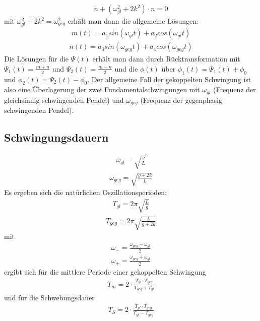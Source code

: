 \documentclass[a4paper,10pt]{scrartcl}
\begin{document}
\begin{itemize}
\begin{itemize}
\begin{align}
					\ddot{n}+(\omega_{gl}^{2}+2k^{2})\cdot n = 0
					\end{align}
					mit \(\omega_{gl}^{2}+2k^{2}=\omega_{geg}^{2}\)
					erhält man dann die allgemeine Lösungen:
					\begin{align}
					m(t)=a_{1}sin(\omega_{gl}t)+a_{2}cos(\omega_{gl}t)
					\end{align}
					\begin{align}
					n(t)=a_{3}sin(\omega_{geg}t)+a_{4}cos(\omega_{geg}t)
					\end{align}
					\newpage
					Die Lösungen für die \(\Psi(t)\) erhält man dann durch Rücktransformation mit \(\Psi_{1}(t)=\frac{m+n}{2}\) und \(\Psi_{2}(t)=\frac{m-n}{2}\) und die \(\phi(t)\) über \(\phi_{1}(t)=\Psi_{1}(t)+\phi_{0}\) und \(\phi_{2}(t)=\Psi_{2}(t)-\phi_{0}\). Der allgemeine Fall der gekoppelten Schwingung ist also eine Überlagerung der zwei Fundamentalschwingungen mit \(\omega_{gl}\) (Frequenz der gleichsinnig schwingenden Pendel) und \(\omega_{geg}\) (Frequenz der gegenphasig schwingenden Pendel). 
				\end{itemize}
			
			\end{itemize}
		\subsection{Schwingungsdauern}
			\begin{align}
			\omega_{gl}=\sqrt{\frac{g}{L}}
			\end{align}
			\begin{align}
			\omega_{geg}=\sqrt{\frac{g+2k}{L}}
			\end{align}
			Es ergeben sich die natürlichen Oszillationsperioden:
			\begin{align}
			T_{gl}=2\pi \sqrt{\frac{L}{g}}
			\end{align}
			\begin{align}
			T_{geg}=2\pi \sqrt{\frac{L}{g+2k}}
			\end{align}
			mit
			\begin{align*}
			\omega_{-}=\frac{\omega_{geg}-\omega_{gl}}{2}
			\end{align*}
			\begin{align*}
			\omega_{+}=\frac{\omega_{geg}+\omega_{gl}}{2}
			\end{align*}
			ergibt sich für die mittlere Periode einer gekoppelten Schwingung
			\begin{align}
			T_{m}=2\cdot \frac{T_{gl}\cdot T_{geg}}{T_{geg}+T_{gl}}
			\end{align}
			und für die Schwebungsdauer
			\begin{align}
			T_{S}=2\cdot \frac{T_{gl}\cdot T_{geg}}{T_{gl}-T_{geg}}
			\end{align}
		
\end{document}
